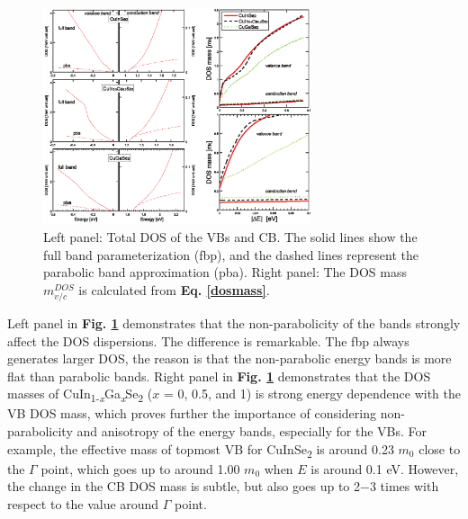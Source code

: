 \documentclass[a4paper, 12pt, titlepage,oneside,drop]{kthesis}
\begin{document}
 \begin{figure}[H]
 \centering
            \includegraphics[width=0.7\textwidth,clip]{JAP2}
    \caption{Left panel: Total DOS of the VBs and CB. The solid lines show the full band parameterization (fbp), and the dashed lines represent the parabolic band approximation (pba). Right panel: The DOS mass $m_{v/c}^{DOS}$ is 
    calculated from \textbf{Eq. \ref{dosmass}}. }
   \label{dost}
\end{figure}


Left panel in \textbf{Fig. \ref{dost}} demonstrates that the non-parabolicity of the bands strongly affect the DOS dispersions. The difference is remarkable. The fbp always generates larger DOS, the reason is that the non-parabolic 
energy bands is more flat than parabolic bands. Right panel in \textbf{Fig. \ref{dost}} demonstrates that the DOS masses of {CuIn\textsubscript{1-\textit{x}}Ga\textsubscript{\textit{x}}Se\textsubscript{2}} ($x$ = 0, 0.5, and 1) is strong energy dependence with the VB DOS mass, which proves further the importance of considering 
non-parabolicity and anisotropy of the energy bands, especially for the VBs. For example, the effective mass of topmost VB for CuInSe\textsubscript{2} is around 0.23 $m_0$ close to the $\Gamma$ point, which goes up to
around 1.00 $m_0$ when $E$ is around 0.1 eV. However, the change in the CB DOS mass is subtle, but also goes up to 2$-$3 times with respect to the value around $\Gamma$ point.
\end{document}
